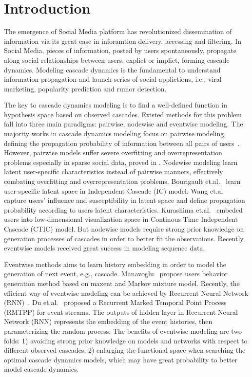 \section{Introduction}

The emergence of Social Media platform has revolutionized dissemination of
information via its great ease in inforamtion delivery, accessing and filtering. 
In Social Media, pieces of information, posted by users spontaneously, propagate
along social relationships between users, explict or implict, forming cascade dynamics.
Modeling cascade dynamics is the fundamental to understand information
propagation and launch series of social applictions, i.e., viral marketing, popularity
prediction and rumor detection. 

The key to cascade dynamics modeling is to find a well-defined function in
hypothesis space based on observed cascades. Existed methods for this problem
fall into three main paradigms: pairwise, nodewise and eventwise modeling. The
majority works in cascade dynamics modeling focus on pairwise modeling,
defining the propagation probability of information between all pairs of
users~\cite{SaitoPredDiffusionProb08,goyal2010learning,gomez2013modeling}.
However, pairwise models suffer severe overfitting and overrepresentation
problems especially in sparse social data, proved in \cite{WangAAAI15}.
Nodewise modeling learn latent user-specific characteristics instead of pairwise
manners, effectively combating overfitting and overrepresentation problems.
Bourigault et.al.~\cite{bourigault2016representation} learn user-specific
latent space in Independent Cascade (IC) model. Wang et.al~\cite{WangAAAI15}
capture users' influence and susceptibility in latent space and define
propagation probability according to users latent characteristics.
Kurashima et.al.~\cite{KurashimaKDD14} embeded users into low-dimensional
visualization space in Continous Time Independent Cascade (CTIC) model. But
nodewise models require strong prior knowledge on generation processes of
cascades in order to better fit the observations. Recently, eventwise models
received great success in modeling sequence data. 

Eventwise methods aims to learn history embedding in order to model the
generation of next event, e.g., cascade. 
Manavoglu~\cite{Manavoglu2003userbehaviormodels} propose users behavior
generation method based on maxent and Markov mixture model. Recently, the
efficient way of eventwise modeling can be achieved by Recurrent Neural Network
(RNN)~\cite{bengio2003neural,goldberg2014word2vec,mikolov2010recurrent,sundermeyer2012lstm}.
Du et.al.~\cite{DuKDD2016} proposed a Recurrent Marked Temporal Point Process
(RMTPP) for event streams. The outputs of hidden layer in Recurrent Neural
Network (RNN) represents the embedding of the event histories,
then parameterizing the random process. The benefits of eventwise modeling are
two folds: 1) avoiding strong prior knowledge on models and networks with
respect to different observed cascades; 2) enlarging the functional space when
searching the optimal cascade dynamics models, which may have great probability
to better model cascade dynamics. 


